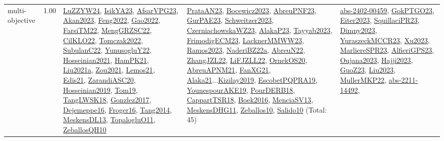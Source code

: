 {\begin{longtable}{p{3cm}r>{\raggedright\arraybackslash}p{6cm}>{\raggedright\arraybackslash}p{6cm}>{\raggedright\arraybackslash}p{8cm}}
\index{multi-objective}\index{Concepts!multi-objective}multi-objective &  1.00 & \hyperref[detail:LuZZYW24]{LuZZYW24}, \hyperref[detail:IsikYA23]{IsikYA23}, \hyperref[detail:AfsarVPG23]{AfsarVPG23}, \hyperref[detail:Akan2023]{Akan2023}, \hyperref[detail:Feng2022]{Feng2022}, \hyperref[detail:Gao2022]{Gao2022}, \hyperref[detail:FarsiTM22]{FarsiTM22}, \hyperref[detail:MengGRZSC22]{MengGRZSC22}, \hyperref[detail:CilKLO22]{CilKLO22}, \hyperref[detail:Tomczak2022]{Tomczak2022}, \hyperref[detail:SubulanC22]{SubulanC22}, \hyperref[detail:YunusogluY22]{YunusogluY22}, \hyperref[detail:Hosseinian2021]{Hosseinian2021}, \hyperref[detail:HamPK21]{HamPK21}, \hyperref[detail:Liu2021a]{Liu2021a}, \hyperref[detail:Zou2021]{Zou2021}, \hyperref[detail:Lemos21]{Lemos21}, \hyperref[detail:Edis21]{Edis21}, \hyperref[detail:ZarandiASC20]{ZarandiASC20}, \hyperref[detail:Hosseinian2019]{Hosseinian2019}, \hyperref[detail:Tom19]{Tom19}, \hyperref[detail:TangLWSK18]{TangLWSK18}, \hyperref[detail:Gonzlez2017]{Gonzlez2017}, \hyperref[detail:Dejemeppe16]{Dejemeppe16}, \hyperref[detail:Froger16]{Froger16}, \hyperref[detail:Tang2014]{Tang2014}, \hyperref[detail:MeskensDL13]{MeskensDL13}, \hyperref[detail:TopalogluO11]{TopalogluO11}, \hyperref[detail:ZeballosQH10]{ZeballosQH10} & \hyperref[detail:PrataAN23]{PrataAN23}, \hyperref[detail:Bocewicz2023]{Bocewicz2023}, \hyperref[detail:AbreuPNF23]{AbreuPNF23}, \hyperref[detail:GurPAE23]{GurPAE23}, \hyperref[detail:Schweitzer2023]{Schweitzer2023}, \hyperref[detail:CzerniachowskaWZ23]{CzerniachowskaWZ23}, \hyperref[detail:AlakaP23]{AlakaP23}, \hyperref[detail:Tayyab2023]{Tayyab2023}, \hyperref[detail:FrimodigECM23]{FrimodigECM23}, \hyperref[detail:LacknerMMWW23]{LacknerMMWW23}, \hyperref[detail:Ramos2023]{Ramos2023}, \hyperref[detail:NaderiBZ22a]{NaderiBZ22a}, \hyperref[detail:AbreuN22]{AbreuN22}, \hyperref[detail:ZhangJZL22]{ZhangJZL22}, \hyperref[detail:LiFJZLL22]{LiFJZLL22}, \hyperref[detail:OrnekOS20]{OrnekOS20}, \hyperref[detail:AbreuAPNM21]{AbreuAPNM21}, \hyperref[detail:FanXG21]{FanXG21}, \hyperref[detail:Alaka21]{Alaka21}...\hyperref[detail:Kizilay2019]{Kizilay2019}, \hyperref[detail:EscobetPQPRA19]{EscobetPQPRA19}, \hyperref[detail:YounespourAKE19]{YounespourAKE19}, \hyperref[detail:PourDERB18]{PourDERB18}, \hyperref[detail:CappartTSR18]{CappartTSR18}, \hyperref[detail:Boek2016]{Boek2016}, \hyperref[detail:MenciaSV13]{MenciaSV13}, \hyperref[detail:MeskensDHG11]{MeskensDHG11}, \hyperref[detail:Zeballos10]{Zeballos10}, \hyperref[detail:Salido10]{Salido10} (Total: 45) & \hyperref[detail:abs-2402-00459]{abs-2402-00459}, \hyperref[detail:GokPTGO23]{GokPTGO23}, \hyperref[detail:Eiter2023]{Eiter2023}, \hyperref[detail:SquillaciPR23]{SquillaciPR23}, \hyperref[detail:Dimny2023]{Dimny2023}, \hyperref[detail:YuraszeckMCCR23]{YuraszeckMCCR23}, \hyperref[detail:Xu2023]{Xu2023}, \hyperref[detail:MarliereSPR23]{MarliereSPR23}, \hyperref[detail:AlfieriGPS23]{AlfieriGPS23}, \hyperref[detail:Oujana2023]{Oujana2023}, \hyperref[detail:Hajji2023]{Hajji2023}, \hyperref[detail:GuoZ23]{GuoZ23}, \hyperref[detail:Liu2023]{Liu2023}, \hyperref[detail:MullerMKP22]{MullerMKP22}, \hyperref[detail:abs-2211-14492]{abs-2211-14492}, 
\end{longtable}}
